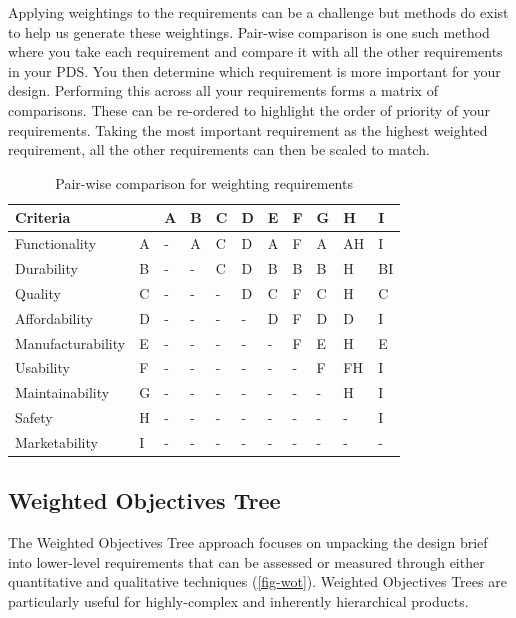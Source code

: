  Applying weightings to the requirements can be a challenge but methods do exist to help us generate these weightings. Pair-wise comparison is one such method where you take each requirement and compare it with all the other requirements in your \ac{PDS}. You then determine which requirement is more important for your design. Performing this across all your requirements forms a matrix of comparisons. These can be re-ordered to highlight the order of priority of your requirements. Taking the most important requirement as the highest weighted requirement, all the other requirements can then be scaled to match.

\begin{table}
\centering
\caption{Pair-wise comparison for weighting requirements}
\begin{tabular}{l l | l l l l l l l l l}
\toprule
Criteria & & A & B & C & D & E & F & G & H & I \\
\midrule
Functionality & A & - & A & C & D & A & F & A & AH & I \\
Durability & B & - & - & C & D & B & B & B & H & BI \\
Quality & C & - & - & - & D & C & F & C & H & C \\
Affordability & D & - & - & - & - & D & F & D & D & I \\
Manufacturability & E & - & - & - & - & - & F & E & H & E \\
Usability & F & - & - & - & - & - & - & F & FH & I \\
Maintainability & G & - & - & - & - & - & - & - & H & I \\
Safety & H & - & - & - & - & - & - & - & - & I \\
Marketability & I & - & - & - & - & - & - & - & - & - \\
\bottomrule
\end{tabular}
\end{table}

\subsection{Weighted Objectives Tree}

The Weighted Objectives Tree approach focuses on unpacking the design brief into lower-level requirements that can be assessed or measured through either quantitative and qualitative techniques (\cref{fig-wot}). Weighted Objectives Trees are particularly useful for highly-complex and inherently hierarchical products.

